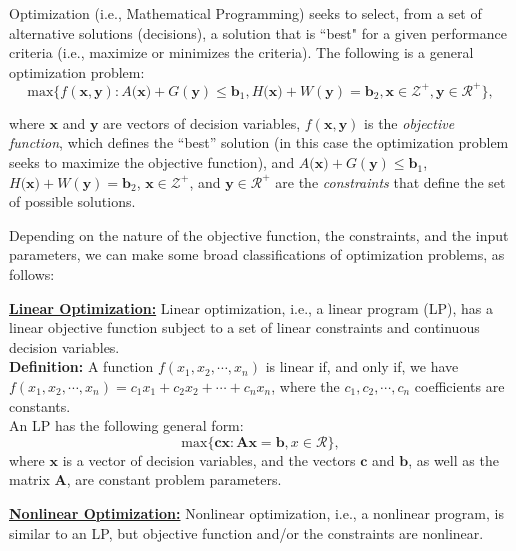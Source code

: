 %


Optimization (i.e., Mathematical Programming) seeks to select, from a set of alternative solutions (decisions), a solution that is ``best" for a given performance criteria (i.e., maximize or minimizes the criteria). The following is a general optimization problem: 
$$ \text{max} \{f(\mathbf{x},\mathbf{y}): A(\mathbf{x)} + G(\mathbf{y}) \le \mathbf{b}_1, H(\mathbf{x)} + W(\mathbf{y}) =  \mathbf{b}_2, \mathbf{x} \in \mathcal{Z^+}, \mathbf{y} \in \mathcal{R^+}\},$$ 

where $\mathbf{x}$ and $\mathbf{y}$ are vectors of decision variables, $f(\mathbf{x},\mathbf{y})$ is the {\it objective function}, which defines the ``best'' solution (in this case the optimization problem seeks to maximize the objective function), and $A(\mathbf{x)} + G(\mathbf{y}) \le \mathbf{b}_1$, $H(\mathbf{x)} + W(\mathbf{y}) = \mathbf{b}_2$, $\mathbf{x} \in \mathcal{Z^+}$, and $\mathbf{y} \in \mathcal{R^+}$ are the {\it constraints} that define the set of possible solutions.


\bigskip Depending on the nature of the objective function, the constraints, and the input parameters, we can make some broad classifications of optimization problems, as follows:

\bigskip \underline{\bf Linear Optimization:} Linear optimization, i.e., a linear program (LP), has a linear objective function subject to a set of linear constraints and continuous decision variables.\\

 {\bf Definition:} A function $f(x_1,x_2,\cdots,x_n)$ is linear if, and only if, we have $f(x_1,x_2,\cdots,x_n) = c_1x_1 + c_2x_2 + \cdots + c_nx_n$, where the  $c_1,c_2,\cdots,c_n$ coefficients are constants.  \\

An LP has the following general form:
$$ \text{max} \{\mathbf{cx}: \mathbf{A}\mathbf{x} = \mathbf{b},  x \in \mathcal{R}\},$$ where $\mathbf{x}$ is a vector of decision variables, and the vectors $\mathbf{c}$ and $\mathbf{b}$, as well as the matrix $\mathbf{A}$, are constant problem parameters.

\bigskip \underline{\bf Nonlinear Optimization:} Nonlinear optimization, i.e., a nonlinear program, is similar to an LP, but objective function and/or the constraints are nonlinear. \\

